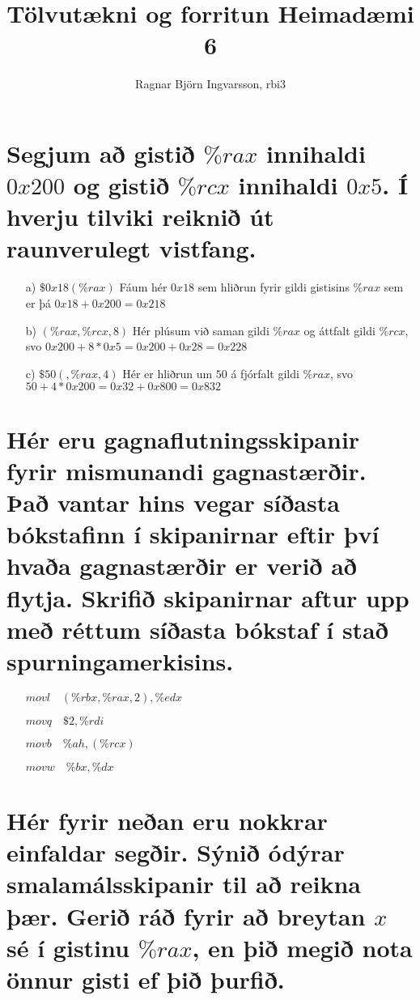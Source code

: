 \documentclass{article}
\title{Tölvutækni og forritun Heimadæmi 6}
\author{Ragnar Björn Ingvarsson, rbi3}
\begin{document}
\renewcommand\thepage{}
	
	\maketitle

	\newpage
	\setcounter{page}{1}
	\renewcommand\thepage{\arabic{page}}

	\section{Segjum að gistið $\%rax$ innihaldi $0x200$ og gistið $\%rcx$ 
		innihaldi $0x5$. Í hverju tilviki reiknið út raunverulegt vistfang.}
	\begin{itemize}
		\item[a)] $\$0x18(\%rax)$ Fáum hér $0x18$ sem hliðrun fyrir gildi 
			gistisins $\%rax$ sem er þá $0x18 + 0x200 = 0x218$
		\item[b)] $(\%rax,\%rcx,8)$ Hér plúsum við saman gildi $\%rax$ og 
			áttfalt gildi $\%rcx$, svo $0x200 + 8 * 0x5 = 0x200 + 0x28 = 
			0x228$
		\item[c)] $\$50(,\%rax,4)$ Hér er hliðrun um $50$ á fjórfalt gildi 
			$\%rax$, svo $50 + 4 * 0x200 = 0x32 + 0x800 = 0x832$
	\end{itemize}

	\section{Hér eru gagnaflutningsskipanir fyrir mismunandi gagnastærðir. 
		Það vantar hins vegar síðasta bókstafinn í skipanirnar eftir því 
		hvaða gagnastærðir er verið að flytja. Skrifið skipanirnar aftur 
		upp með réttum síðasta bókstaf í stað spurningamerkisins.}

		\begin{itemize}
			\item[] $movl \hspace{1em} (\%rbx, \%rax, 2), \%edx$
			\item[] $movq \hspace{1em} \$2, \%rdi$
			\item[] $movb \hspace{1em} \%ah, (\%rcx)$
			\item[] $movw \hspace{1em} \%bx, \%dx$
		\end{itemize}

	\section{Hér fyrir neðan eru nokkrar einfaldar segðir. Sýnið ódýrar 
	smalamálsskipanir til að reikna þær. Gerið ráð fyrir að breytan $x$ sé 
	í gistinu $\%rax$, en þið megið nota önnur gisti ef þið þurfið.}
\end{document}
